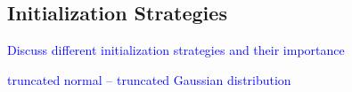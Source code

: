 \subsection{Initialization Strategies}

\textcolor{blue}{Discuss different initialization strategies and their importance}

\textcolor{blue}{truncated normal -- truncated Gaussian distribution}